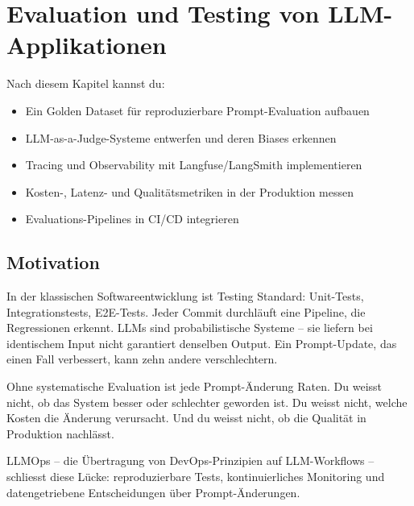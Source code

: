 \chapter{Evaluation und Testing von LLM-Applikationen}

\label{chap:evaluation}

\begin{lernziele}
Nach diesem Kapitel kannst du:
\begin{itemize}
    \item Ein Golden Dataset für reproduzierbare Prompt-Evaluation aufbauen
    \item LLM-as-a-Judge-Systeme entwerfen und deren Biases erkennen
    \item Tracing und Observability mit Langfuse/LangSmith implementieren
    \item Kosten-, Latenz- und Qualitätsmetriken in der Produktion messen
    \item Evaluations-Pipelines in CI/CD integrieren
\end{itemize}
\end{lernziele}

\section{Motivation}

In der klassischen Softwareentwicklung ist Testing Standard: Unit-Tests, Integrationstests, E2E-Tests. Jeder Commit durchläuft eine Pipeline, die Regressionen erkennt. LLMs sind probabilistische Systeme -- sie liefern bei identischem Input nicht garantiert denselben Output. Ein Prompt-Update, das einen Fall verbessert, kann zehn andere verschlechtern.

Ohne systematische Evaluation ist jede Prompt-Änderung Raten. Du weisst nicht, ob das System besser oder schlechter geworden ist. Du weisst nicht, welche Kosten die Änderung verursacht. Und du weisst nicht, ob die Qualität in Produktion nachlässt.

LLMOps -- die Übertragung von DevOps-Prinzipien auf LLM-Workflows -- schliesst diese Lücke: reproduzierbare Tests, kontinuierliches Monitoring und datengetriebene Entscheidungen über Prompt-Änderungen.

